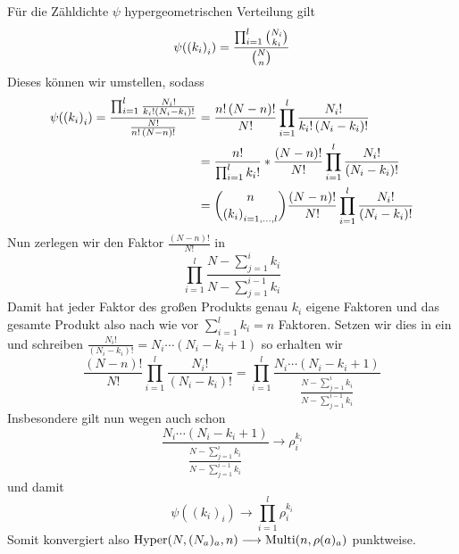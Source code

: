 \begin{exercisePage}
	Für die Zähldichte $\psi$ hypergeometrischen Verteilung gilt 
	\begin{equation*}
		\psi(\folge{k_i}[i]) = \frac{ \prod_{i = 1}^l \binom{N_i}{k_i}}{\binom{N}{n}}
	\end{equation*}
	Dieses können wir umstellen, sodass
	\begin{align}
		\psi(\folge{k_i}[i]) 
		= \frac{\prod_{i = 1}^l \frac{N_i!}{k_i! (N_i - k_i)!}}{\frac{N!}{n! \, (N-n)!}} 
		&= \carf{N!}{n! \, (N-n)!} \prod_{i = 1}^l \frac{N_i!}{k_i! \, (N_i - k_i)!} \notag \\
		&= \frac{n!}{\prod_{i=1}^{l} k_i!} * \frac{(N-n)!}{N!} \prod_{i = 1}^l \frac{N_i!}{(N_i - k_i)!} \notag \\
		&= \binom{n}{\folge{k_i}[i=1,\dots,l]} \frac{(N-n)!}{N!} \prod_{i = 1}^l \frac{N_i!}{(N_i - k_i)!} 
\label{eq: 2_2_umstellung}
	\end{align}
	Nun zerlegen wir den Faktor $\frac{(N-n)!}{N!}$ in 
	\begin{equation*}
		\prod_{i=1}^l \frac{N - \sum_{j=1}^{i} k_i}{N - \sum_{j=1}^{i-1} k_i}
	\end{equation*}
	Damit hat jeder Faktor des großen Produkts genau $k_i$ eigene Faktoren und das gesamte Produkt also nach wie vor $\sum_{i=1}^{l} k_i = n$ Faktoren.
	Setzen wir dies in  ein und schreiben $\frac{N_i!}{(N_i - k_i)!} = N_i \cdots (N_i - k_i + 1)$ so erhalten wir
	\begin{equation*}
		\frac{(N-n)!}{N!} \prod_{i = 1}^l \frac{N_i!}{(N_i - k_i)!}
		= \prod_{i=1}^l \frac{N_i \cdots (N_i - k_i + 1)}{\frac{N - \sum_{j=1}^{i} k_i}{N - \sum_{j=1}^{i-1} k_i}}
	\end{equation*}
	Insbesondere gilt nun wegen  auch schon
	\begin{equation*}
		 \frac{N_i \cdots (N_i - k_i + 1)}{\frac{N - \sum_{j=1}^{i} k_i}{N - \sum_{j=1}^{i-1} k_i}} 
		\longrightarrow \rho_i^{k_i}
	\end{equation*}
	und damit
	\begin{equation*}
		\psi((k_i)_i) \longrightarrow \prod_{i=1}^l \rho_i^{k_i}
	\end{equation*}
	Somit konvergiert also $\operatorname{Hyper}(N, (N_a)_a, n) \longrightarrow \operatorname{Multi}(n, \rho(a)_a)$ punktweise.
	
	


\end{exercisePage}

